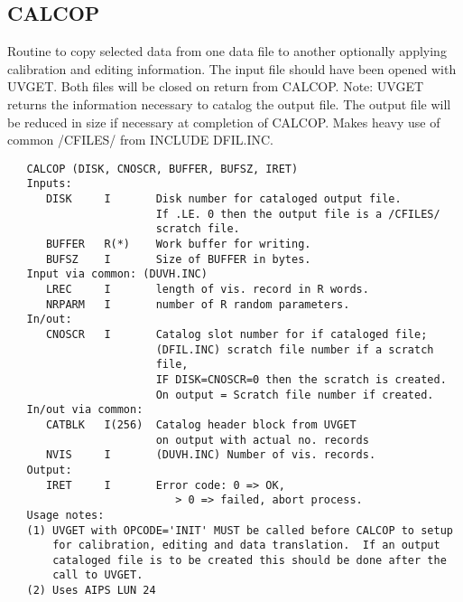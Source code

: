 \subsection{CALCOP}
Routine to copy selected data from one data file to another
optionally applying calibration and editing information.  The input
file should have been opened with UVGET.  Both files will be closed
on return from CALCOP.
  Note: UVGET returns the information necessary to catalog the
output file.  The output file will be reduced in size if necessary at
completion of CALCOP.  Makes heavy use of common /CFILES/ from INCLUDE
DFIL.INC.
\begin{verbatim}
   CALCOP (DISK, CNOSCR, BUFFER, BUFSZ, IRET)
   Inputs:
      DISK     I       Disk number for cataloged output file.
                       If .LE. 0 then the output file is a /CFILES/
                       scratch file.
      BUFFER   R(*)    Work buffer for writing.
      BUFSZ    I       Size of BUFFER in bytes.
   Input via common: (DUVH.INC)
      LREC     I       length of vis. record in R words.
      NRPARM   I       number of R random parameters.
   In/out:
      CNOSCR   I       Catalog slot number for if cataloged file;
                       (DFIL.INC) scratch file number if a scratch
                       file,
                       IF DISK=CNOSCR=0 then the scratch is created.
                       On output = Scratch file number if created.
   In/out via common:
      CATBLK   I(256)  Catalog header block from UVGET
                       on output with actual no. records
      NVIS     I       (DUVH.INC) Number of vis. records.
   Output:
      IRET     I       Error code: 0 => OK,
                          > 0 => failed, abort process.
   Usage notes:
   (1) UVGET with OPCODE='INIT' MUST be called before CALCOP to setup
       for calibration, editing and data translation.  If an output
       cataloged file is to be created this should be done after the
       call to UVGET.
   (2) Uses AIPS LUN 24
\end{verbatim}

